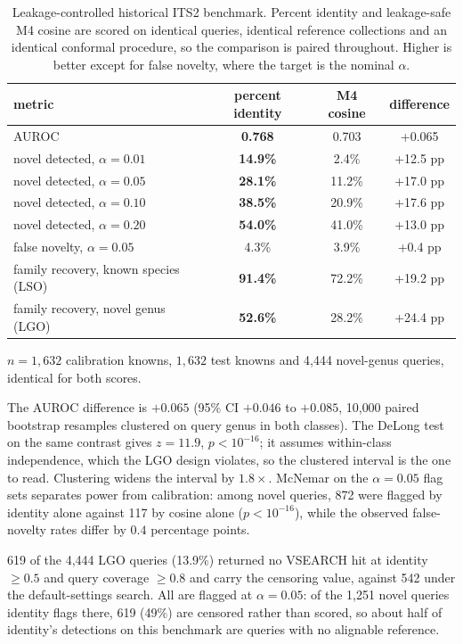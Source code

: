 \begin{table}[htbp]\centering
\begin{threeparttable}
\caption{Leakage-controlled historical ITS2 benchmark. Percent identity and leakage-safe M4 cosine are scored on identical queries, identical reference collections and an identical conformal procedure, so the comparison is paired throughout. Higher is better except for false novelty, where the target is the nominal $\alpha$.}
\label{tab:historical}
\begin{tabular}{lccc}
\toprule
metric & percent identity & M4 cosine & difference \\
\midrule
AUROC & \textbf{0.768} & 0.703 & +0.065 \\
novel detected, $\alpha=0.01$ & \textbf{14.9\%} & 2.4\% & +12.5 pp \\
novel detected, $\alpha=0.05$ & \textbf{28.1\%} & 11.2\% & +17.0 pp \\
novel detected, $\alpha=0.10$ & \textbf{38.5\%} & 20.9\% & +17.6 pp \\
novel detected, $\alpha=0.20$ & \textbf{54.0\%} & 41.0\% & +13.0 pp \\
false novelty, $\alpha=0.05$ & 4.3\% & 3.9\% & +0.4 pp \\
\addlinespace
family recovery, known species (LSO) & \textbf{91.4\%} & 72.2\% & +19.2 pp \\
family recovery, novel genus (LGO) & \textbf{52.6\%} & 28.2\% & +24.4 pp \\
\bottomrule
\end{tabular}
\begin{tablenotes}\footnotesize
\item $n=1{,}632$ calibration knowns, $1{,}632$ test knowns and 4,444 novel-genus queries, identical for both scores.
\item The AUROC difference is $+0.065$ (95\% CI $+0.046$ to $+0.085$, 10{,}000 paired bootstrap resamples clustered on query genus in both classes). The DeLong test on the same contrast gives $z=11.9$, $p<10^{-16}$; it assumes within-class independence, which the LGO design violates, so the clustered interval is the one to read. Clustering widens the interval by $1.8\times$. McNemar on the $\alpha=0.05$ flag sets separates power from calibration: among novel queries, 872 were flagged by identity alone against 117 by cosine alone ($p<10^{-16}$), while the observed false-novelty rates differ by $0.4$ percentage points.
\item 619 of the 4,444 LGO queries (13.9\%) returned no VSEARCH hit at identity $\geq0.5$ and query coverage $\geq0.8$ and carry the censoring value, against 542 under the default-settings search. All are flagged at $\alpha=0.05$: of the 1,251 novel queries identity flags there, 619 (49\%) are censored rather than scored, so about half of identity's detections on this benchmark are queries with no alignable reference.

\end{tablenotes}
\end{threeparttable}
\end{table}
